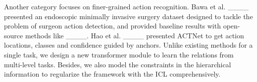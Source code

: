 Another category focuses on finer-grained action recognition. Bawa et al. ____ presented an endoscopic minimally invasive surgery dataset designed to tackle the problem of surgeon action detection, and provided baseline results with open-source methods like ____. Hao et al. ____  presented ACTNet to get action locations, classes and confidence guided by anchors. Unlike existing methods for a single task, we design a new transformer module to learn the relations from multi-level tasks. Besides, we also model the constraints in the hierarchical information to regularize the framework with the ICL comprehensively.


